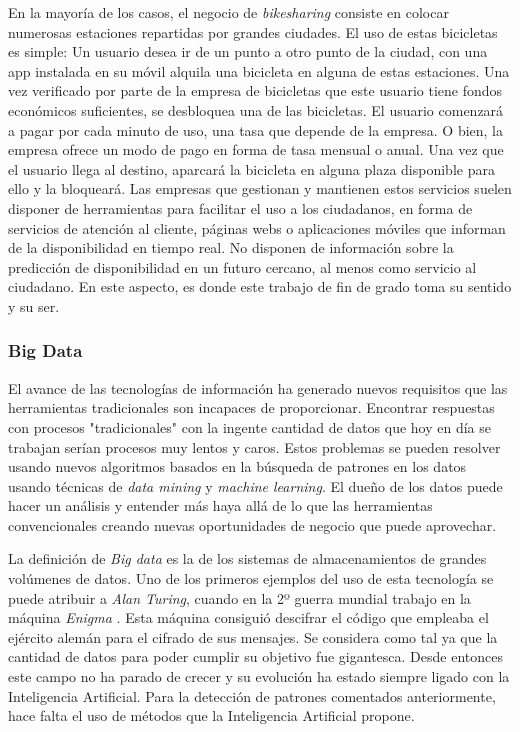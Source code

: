 En la mayoría de los casos, el negocio de \textit{bikesharing} consiste en colocar numerosas estaciones repartidas por grandes ciudades. El uso de estas bicicletas es simple: Un usuario desea ir de un punto a otro punto de la ciudad, con una app instalada en su móvil alquila una bicicleta en alguna de estas estaciones. Una vez verificado por parte de la empresa de bicicletas que este usuario tiene fondos económicos suficientes, se desbloquea una de las bicicletas. El usuario comenzará a pagar por cada minuto de uso, una tasa que depende de la empresa. O bien, la empresa ofrece un modo de pago en forma de tasa mensual o anual. Una vez que el usuario llega al destino, aparcará la bicicleta en alguna plaza disponible para ello y la bloqueará. Las empresas que gestionan y mantienen estos servicios suelen disponer de herramientas para facilitar el uso a los ciudadanos, en forma de servicios de atención al cliente, páginas webs o aplicaciones móviles que informan de la disponibilidad en tiempo real. No disponen de información sobre la predicción de disponibilidad en un futuro cercano, al menos como servicio al ciudadano. En este aspecto, es donde este trabajo de fin de grado toma su sentido y su ser.
\newline



\subsubsection{Big Data}
El avance de las tecnologías de información ha generado nuevos requisitos que las herramientas tradicionales son incapaces de proporcionar. Encontrar respuestas con procesos "tradicionales" con la ingente cantidad de datos que hoy en día se trabajan serían procesos muy lentos y caros. Estos problemas se pueden resolver usando nuevos algoritmos basados en la búsqueda de patrones en los datos usando técnicas de \textit{data mining} y \textit{machine learning}. El dueño de los datos puede hacer un análisis y entender más haya allá de lo que las herramientas convencionales creando nuevas oportunidades de negocio que puede aprovechar.
\newline

La definición de \textit{Big data} es la de los sistemas de almacenamientos de grandes volúmenes de datos. Uno de los primeros ejemplos del uso de esta tecnología se puede atribuir a \textit{Alan Turing}, cuando en la 2º guerra mundial trabajo en la máquina \textit{Enigma} \cite{alan_turing}. Esta máquina consiguió descifrar el código que empleaba el ejército alemán para el cifrado de sus mensajes. Se considera como tal ya que la cantidad de datos para poder cumplir su objetivo fue gigantesca. Desde entonces este campo no ha parado de crecer y su evolución ha estado siempre ligado con la Inteligencia Artificial. Para la detección de patrones comentados anteriormente, hace falta el uso de métodos que la Inteligencia Artificial propone.
\newline

